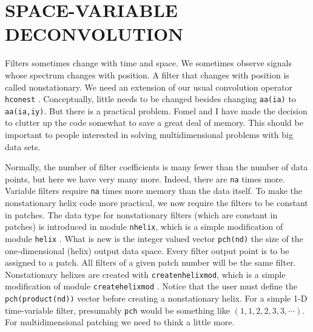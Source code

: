 \section{SPACE-VARIABLE DECONVOLUTION}
Filters sometimes change with time and space.
We sometimes observe signals whose spectrum changes with position.
A filter that changes with position is called nonstationary.
We need an extension of our usual convolution operator
\texttt{hconest} .
Conceptually,
little needs to be changed besides changing 
\texttt{aa(ia)} to
\texttt{aa(ia,iy)}.
But there is a practical problem.
Fomel and I have made the decision
to clutter up the code somewhat
to save a great deal of memory.
This should be important to people interested in
solving multidimensional problems with big data sets.
\par
Normally, the number of filter coefficients is many fewer
than the number of data points,
but here we have very many more.
Indeed, there are {\tt na} times more.
Variable filters require {\tt na} times more memory than the data itself.
To make the nonstationary helix code more practical,
we now require the filters to be constant in patches.
The data type for nonstationary filters
(which are constant in patches)
is introduced in module
	\texttt{nhelix}, which is a simple modification of module
	\texttt{helix} .
What is new is the integer valued vector \texttt{pch(nd)}
the size of the one-dimensional (helix) output data space.
Every filter output point is to be assigned to a patch.
All filters of a given patch number will be the same filter.
Nonstationary helixes are created with
	\texttt{createnhelixmod}, which is a simple modification of module
	\texttt{createhelixmod} .
Notice that the user must define the \texttt{pch(product(nd))}
vector before creating a nonstationary helix.
For a simple 1-D time-variable filter,
presumably \texttt{pch} would be something like
$(1,1,2,2,3,3,\cdots)$.
For multidimensional patching we need to think a little more.

